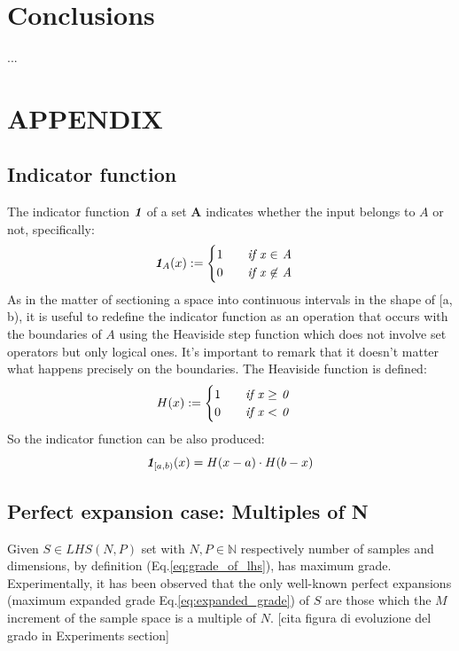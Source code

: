 \documentclass[12pt]{extarticle}
\newcommand{\meqref}[1]{Eq.\ref{#1}}
\newcommand{\indfunc}[1]{\textit{\textbf{1}}_{#1}}
\begin{document}
\section{Conclusions}
\label{sec:conclusions}
...

\section{APPENDIX}
\subsection{Indicator function}
\label{appendix:indicator_function}
The indicator function $\indfunc{}$ of a set \textbf{A} indicates whether the input belongs  to $A$ or not, specifically:
\begin{equation}
\label{eq:indicator_function}
\indfunc{A}(x) := 
\begin{cases}
1 \qquad \text{\textit{if x $\in$ A}}\\
0 \qquad \text{\textit{if x $\not\in$ A}}
 \end{cases}
\end{equation}
As in the matter of sectioning a space into continuous intervals in the shape of [a, b), it is useful to redefine the indicator function as an operation that occurs with the boundaries of $A$ using the Heaviside step function which does not involve set operators but only logical ones. It's important to remark that it doesn't matter what happens precisely on the boundaries. 
The Heaviside function is defined:
\begin{equation}
\label{eq:heaviside}
H(x) := 
\begin{cases}
1 \qquad \text{\textit{if x $\geq$ 0}}\\
0 \qquad \text{\textit{if x $<$ 0}}
\end{cases}
\end{equation}
So the indicator function can be also produced:
\begin{equation}
\label{eq:indicator_function_with_h}
\indfunc{[a,b)}(x) = H(x - a) \cdot H(b - x)
\end{equation}

\subsection{Perfect expansion case: Multiples of N}
\label{appendix:N_multiples}
Given $S \in LHS(N, P)$ set with $N, P \in \mathbb{N}$ respectively number of samples and dimensions, by definition (\meqref{eq:grade_of_lhs}), has maximum grade. Experimentally, it has been observed that the only well-known perfect expansions (maximum expanded grade \meqref{eq:expanded_grade}) of $S$ are those which the $M$ increment of the sample space is a multiple of $N$. 
[cita figura di evoluzione del grado in Experiments section]
\end{document}
